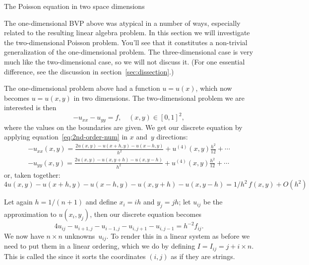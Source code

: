  {The Poisson equation in two space dimensions}
\label{sec:2dbvp}

The one-dimensional \ac{BVP} above was atypical in a number of ways,
especially related to the resulting linear algebra problem. In this
section we will investigate the two-dimensional Poisson problem.
You'll see that it constitutes a non-trivial generalization of the one-dimensional problem.
The three-dimensional case is very much like the two-dimensional case,
so we will not discuss it. (For one essential difference, see the discussion
in section~\ref{sec:dissection}.)

The one-dimensional problem above had a function $u=u(x)$, which now becomes
$u=u(x,y)$ in two dimensions. 
The two-dimensional problem we are interested is then
\begin{equation} -u_{xx}-u_{yy} = f,\quad (x,y)\in[0,1]^2,
  \label{eq:laplace}
\end{equation}
where the values on the boundaries are given. We get our discrete
equation by applying equation~\eqref{eq:2nd-order-num} in $x$ and~$y$
directions:
\[
\begin{array}{l}
  -u_{xx}(x,y)=\frac{2u(x,y)-u(x+h,y)-u(x-h,y)}{h^2}+u^{(4)}(x,y)\frac{h^2}{12}+\cdots\\
  -u_{yy}(x,y)=\frac{2u(x,y)-u(x,y+h)-u(x,y-h)}{h^2}+u^{(4)}(x,y)\frac{h^2}{12}+\cdots
\end{array}
\]
or, taken together:
\begin{equation}
  4u(x,y)-u(x+h,y)-u(x-h,y)-u(x,y+h)-u(x,y-h)=1/h^2\,f(x,y)+O(h^2)
  \label{eq:5-point-star}
\end{equation}

Let again $h=1/(n+1)$ and
define $x_i=ih$ and $y_j=jh$; let $u_{ij}$ be the approximation to
$u(x_i,y_j)$, then
our discrete equation becomes
\begin{equation}
  4u_{ij}-u_{i+1,j}-u_{i-1,j}-u_{i,j+1}-u_{i,j-1}=h^{-2}f_{ij}.
  \label{eq:5-point-star-ij}
\end{equation}
We now have $n\times n$ unknowns~$u_{ij}$. To render this in a linear
system as before we need to put them in a linear ordering, which we do
by defining $I=I_{ij}=j+i\times n$. This is called the
 since it sorts the coordinates
$(i,j)$ as if they are strings.

